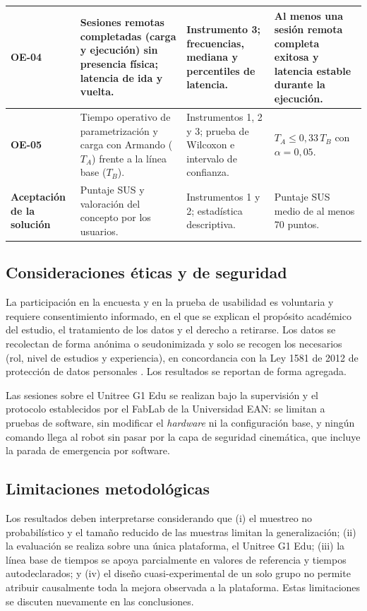 \documentclass[stu,12pt,floatsintext]{apa7}
\begin{document}
\begin{longtable}{|p{2.3cm}|p{4.1cm}|p{4.4cm}|p{3.6cm}|}
\textbf{OE-04} &
Sesiones remotas completadas (carga y ejecución) sin presencia física; latencia de ida y vuelta. &
Instrumento 3; frecuencias, mediana y percentiles de latencia. &
Al menos una sesión remota completa exitosa y latencia estable durante la ejecución. \\
\hline

\textbf{OE-05} &
Tiempo operativo de parametrización y carga con Armando ($T_{A}$) frente a la línea base ($T_{B}$). &
Instrumentos 1, 2 y 3; prueba de Wilcoxon e intervalo de confianza. &
$T_{A} \leq 0{,}33\,T_{B}$ con $\alpha = 0{,}05$. \\
\hline

\textbf{Aceptación de la solución} &
Puntaje SUS y valoración del concepto por los usuarios. &
Instrumentos 1 y 2; estadística descriptiva. &
Puntaje SUS medio de al menos 70 puntos. \\
\hline
\end{longtable}

\subsection{Consideraciones éticas y de seguridad}

La participación en la encuesta y en la prueba de usabilidad es voluntaria y requiere consentimiento informado, en el que se explican el propósito académico del estudio, el tratamiento de los datos y el derecho a retirarse. Los datos se recolectan de forma anónima o seudonimizada y solo se recogen los necesarios (rol, nivel de estudios y experiencia), en concordancia con la Ley 1581 de 2012 de protección de datos personales \parencite{colombia-ley1581-2012}. Los resultados se reportan de forma agregada.

Las sesiones sobre el Unitree G1 Edu se realizan bajo la supervisión y el protocolo establecidos por el FabLab de la Universidad EAN: se limitan a pruebas de software, sin modificar el \textit{hardware} ni la configuración base, y ningún comando llega al robot sin pasar por la capa de seguridad cinemática, que incluye la parada de emergencia por software.

\subsection{Limitaciones metodológicas}

Los resultados deben interpretarse considerando que (i) el muestreo no probabilístico y el tamaño reducido de las muestras limitan la generalización; (ii) la evaluación se realiza sobre una única plataforma, el Unitree G1 Edu; (iii) la línea base de tiempos se apoya parcialmente en valores de referencia y tiempos autodeclarados; y (iv) el diseño cuasi-experimental de un solo grupo no permite atribuir causalmente toda la mejora observada a la plataforma. Estas limitaciones se discuten nuevamente en las conclusiones.
\end{document}
